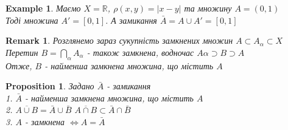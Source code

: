 \documentclass[a4paper, 14pt]{extarticle}
\def\huge{\displaystyle}
\theoremstyle{theoremdd}
\theoremstyle{theoremdd}
\theoremstyle{theoremdd}
\theoremstyle{theoremdd}
\newtheorem{example}[theorem]{Example}
\theoremstyle{theoremdd}
\newtheorem{proposition}[theorem]{Proposition}
\theoremstyle{theoremdd}
\newtheorem{remark}[theorem]{Remark}
\theoremstyle{theoremdd}
\theoremstyle{theoremdd}
\begin{document}
\begin{example}
Маємо $X = \mathbb{R}$, $\rho(x,y) = |x-y|$ та множину $A = (0,1)$\\
Тоді множина $A' = [0,1]$. А замикання $\bar{A} = A \cup A' = [0,1]$
\end{example}

\begin{remark}
Розглянемо зараз сукупність замкнених множин $A \subset A_{\alpha} \subset X$\\
Перетин $B = \huge\bigcap_{\alpha} A_{\alpha}$ - також замкнена, водночас $A\alpha \supset B \supset A$\\
Отже, $B$ - найменша замкнена множина, що містить $A$
\end{remark}

\begin{proposition}
Задано $\bar{A}$ - замикання\\
1. $\bar{A}$ - найменша замкнена множина, що містить $A$\\
2. $\overline{A \cup B} = \bar{A} \cup \bar{B}$ \hspace{0.5cm} $\overline{A \cap B} \subset \bar{A} \cap \bar{B}$\\
3. $A$ - замкнена $\iff A = \bar{A}$
\end{proposition}
\end{document}
